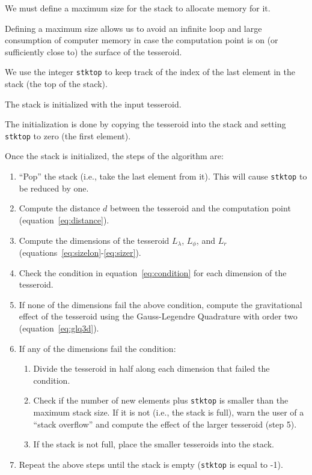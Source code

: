 \documentclass[paper,twocolumn]{geophysics}
\begin{document}
We must define a maximum size for the stack to allocate memory for it.

Defining a maximum size allows us to avoid an infinite loop and large
consumption of computer memory in case the computation point is
on (or sufficiently close to) the surface of the tesseroid.

We use the integer \texttt{stktop} to keep track of the index of the last
element in the stack (the top of the stack).

The stack is initialized with the input tesseroid.

The initialization is done by copying the tesseroid into the stack and
setting \texttt{stktop} to zero (the first element).

Once the stack is initialized, the steps of the algorithm are:

\begin{enumerate}
    \item ``Pop'' the stack (i.e., take the last element from it).
        This will cause \texttt{stktop} to be reduced by one.
    \item Compute the distance $d$ between the tesseroid and
        the computation point (equation~\ref{eq:distance}).
    \item Compute the dimensions of the tesseroid $L_\lambda$, $L_\phi$,
        and $L_r$ (equations~\ref{eq:sizelon}-\ref{eq:sizer}).
    \item Check the condition in equation~\ref{eq:condition} for each
        dimension of the tesseroid.
    \item If none of the dimensions fail the above condition,
        compute the gravitational effect of the tesseroid using the
        Gauss-Legendre Quadrature with order two
        (equation~\ref{eq:glq3d}).
    \item If any of the dimensions fail the condition:
    \begin{enumerate}
        \item Divide the tesseroid in half along each dimension that failed
             the condition.
        \item Check if the number of new elements plus \texttt{stktop}
             is smaller than the maximum stack size.
             If it is not (i.e., the stack is full),
             warn the user of a ``stack overflow''
             and compute the effect of the larger tesseroid (step 5).
        \item If the stack is not full, place the smaller tesseroids into
             the stack.
    \end{enumerate}
    \item Repeat the above steps until the stack is empty
        (\texttt{stktop} is equal to -1).
\end{enumerate}
\end{document}
